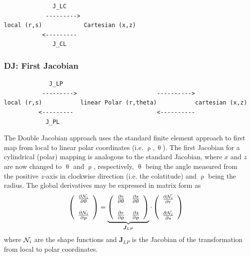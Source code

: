 \begin{verbatim}
              J_LC
            --------->          
local (r,s)            Cartesian (x,z)
           <---------          
              J_CL
\end{verbatim}


\subsubsection{DJ: First Jacobian}


\begin{verbatim}
             J_LP
           --------->                       ---------->
local (r,s)           linear Polar (r,theta)           cartesian (x,z)
          <---------                        <----------
            J_PL
\end{verbatim}


The Double Jacobian approach uses the standard finite element approach to first map 
from local to linear polar coordinates (i.e. $\uprho,\uptheta$). The first Jacobian for 
a cylindrical (polar) mapping is analogous to the standard Jacobian, where $x$ and $z$ 
are now changed to $\uptheta$ and $\uprho$, respectively, $\uptheta$ being the angle 
measured from the positive $z$-axis in clockwise direction (i.e. the colatitude) 
and $\uprho$ being the radius. The global derivatives may be expressed in matrix form as
\begin{equation}
\left(
\begin{array}{c}
\frac{\partial {\mathcal{N}}_i}{\partial \uptheta} \\ \\
\frac{\partial {\mathcal{N}}_i}{\partial \uprho} 
\end{array}
\right)
= 
\underbrace{\left(
\begin{array}{cc}
\frac{\partial r}{\partial \uptheta}  & 
\frac{\partial s}{\partial \uptheta}   \\ \\
\frac{\partial r}{\partial \uprho}  & 
\frac{\partial s}{\partial \uprho}  
\end{array}
\right)}_{{\bm J}_{LP}}
\cdot
\left(
\begin{array}{c}
\frac{\partial {\mathcal{N}}_i}{\partial r} \\ \\
\frac{\partial {\mathcal{N}}_i}{\partial s} 
\end{array}
\right)
\label{eq:DJ1}
\end{equation}
where ${\mathcal{N}}_i$ are the shape functions and ${\bm J}_{LP}$ 
is the Jacobian of the transformation from local to polar coordinates.

